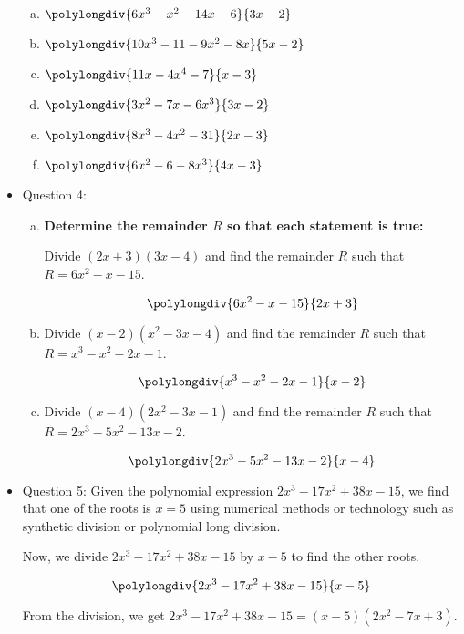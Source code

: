 \documentclass{article}
\begin{document}
\begin{itemize}
\begin{enumerate}[a)]
    \item \(\polylongdiv{6x^3 - x^2 - 14x - 6}{3x - 2}\)
    
    \item \(\polylongdiv{10x^3 - 11 - 9x^2 - 8x}{5x - 2}\)
    
    \item \(\polylongdiv{11x - 4x^4 - 7}{x - 3}\)
    
    \item \(\polylongdiv{3x^2 - 7x - 6x^3}{3x - 2}\)
    
    \item \(\polylongdiv{8x^3 - 4x^2 - 31}{2x - 3}\)
    
    \item \(\polylongdiv{6x^2 - 6 - 8x^3}{4x - 3}\)
\end{enumerate}
\newpage
\item Question 4:
\begin{enumerate}[a)]
    \item \textbf{Determine the remainder \( R \) so that each statement is true:}
    
    Divide \((2x + 3)(3x - 4)\) and find the remainder \( R \) such that \( R = 6x^2 - x - 15 \).
    
    \[
    \polylongdiv{6x^2 - x - 15}{2x + 3}
    \]

    \item Divide \((x - 2)(x^2 - 3x - 4)\) and find the remainder \( R \) such that \( R = x^3 - x^2 - 2x - 1 \).
    
    \[
    \polylongdiv{x^3 - x^2 - 2x - 1}{x - 2}
    \]

    \item Divide \((x - 4)(2x^2 - 3x - 1)\) and find the remainder \( R \) such that \( R = 2x^3 - 5x^2 - 13x - 2 \).
    
    \[
    \polylongdiv{2x^3 - 5x^2 - 13x - 2}{x - 4}
    \]
\end{enumerate}

\item Question 5:
Given the polynomial expression \(2x^3 - 17x^2 + 38x - 15\), we find that one of the roots is \(x = 5\) using numerical methods or technology such as synthetic division or polynomial long division.

Now, we divide \(2x^3 - 17x^2 + 38x - 15\) by \(x - 5\) to find the other roots.

\[
\polylongdiv{2x^3 - 17x^2 + 38x - 15}{x - 5}
\]

From the division, we get \(2x^3 - 17x^2 + 38x - 15 = (x - 5)(2x^2 - 7x + 3)\).


\end{itemize}
\end{document}
